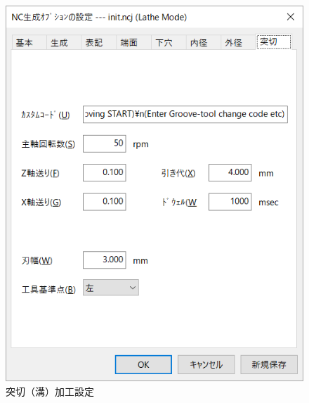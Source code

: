 \begin{figure}[H]
\centering
\includegraphics[scale=0.7]{No2/fig/ncj5.png}
\caption{突切（溝）加工設定}
\label{fig:ncj5.png}
\end{figure}


